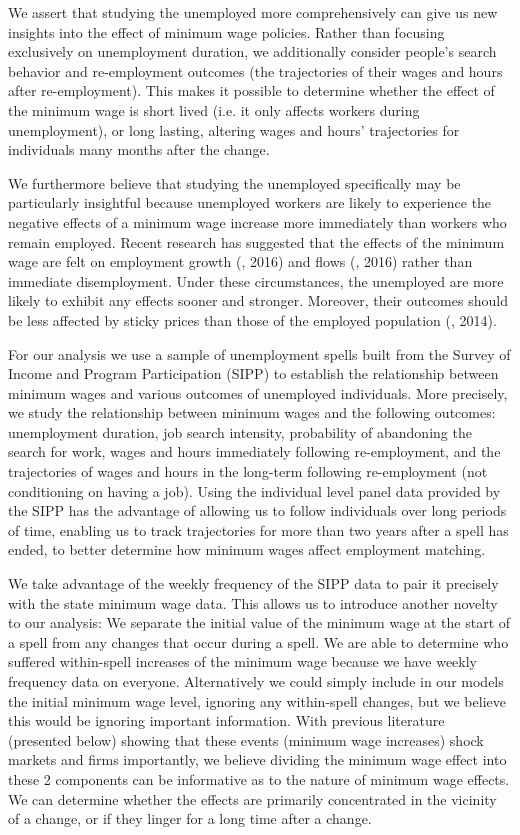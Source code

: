\documentclass{article}
\begin{document}
We assert that studying the unemployed more comprehensively can give us new insights into the effect of minimum wage policies. Rather than focusing exclusively on unemployment duration, we additionally consider people's search behavior and re-employment outcomes (the trajectories of their wages and hours after re-employment). This makes it possible to determine whether the effect of the minimum wage is short lived (i.e. it only affects workers during unemployment), or long lasting, altering wages and hours' trajectories for individuals many months after the change.

We furthermore believe that studying the unemployed specifically may be particularly insightful because unemployed workers are likely to experience the negative effects of a minimum wage increase more immediately than workers who remain employed. Recent research has suggested that the effects of the minimum wage are felt on employment growth (\citeauthor{meer2016effects}, 2016) and flows (\citeauthor{dube2016minimum}, 2016) rather than immediate disemployment. Under these circumstances, the unemployed are more likely to exhibit any effects sooner and stronger. Moreover, their outcomes should be less affected by sticky prices than those of the employed population (\citeauthor{barattieri2014some}, 2014). 

For our analysis we use a sample of unemployment spells built from the Survey of Income and Program Participation (SIPP) to establish the relationship between minimum wages and various outcomes of unemployed individuals. More precisely, we study the relationship between minimum wages and the following outcomes: unemployment duration, job search intensity, probability of abandoning the search for work, wages and hours immediately following re-employment, and the trajectories of wages and hours in the long-term following re-employment (not conditioning on having a job). Using the individual level panel data provided by the SIPP has the advantage of allowing us to follow individuals over long periods of time, enabling us to track trajectories for more than two years after a spell has ended, to better determine how minimum wages affect employment matching. 

We take advantage of the weekly frequency of the SIPP data to pair it precisely with the state minimum wage data. This allows us to introduce another novelty to our analysis: We separate the initial value of the minimum wage at the start of a spell from any changes that occur during a spell. We are able to determine who suffered within-spell increases of the minimum wage because we have weekly frequency data on everyone. Alternatively we could simply include in our models the initial minimum wage level, ignoring any within-spell changes, but we believe this would be ignoring important information. With previous literature (presented below) showing that these events (minimum wage increases) shock markets and firms importantly, we believe dividing the minimum wage effect into these 2 components can be informative as to the nature of minimum wage effects. We can determine whether the effects are primarily concentrated in the vicinity of a change, or if they linger for a long time after a change. 
\end{document}
